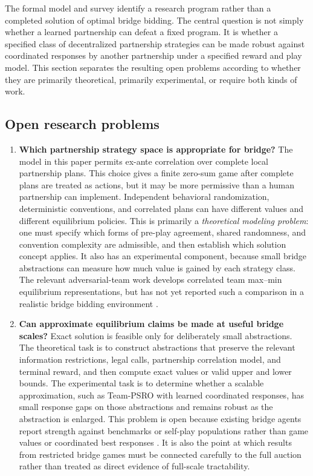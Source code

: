 \documentclass[11pt]{article}
\begin{document}
The formal model and survey identify a research program rather than a completed solution of optimal bridge bidding. The central question is not simply whether a learned partnership can defeat a fixed program. It is whether a specified class of decentralized partnership strategies can be made robust against coordinated responses by another partnership under a specified reward and play model. This section separates the resulting open problems according to whether they are primarily theoretical, primarily experimental, or require both kinds of work.

\subsection{Open research problems}

\begin{enumerate}
    \item \textbf{Which partnership strategy space is appropriate for bridge?} The model in this paper permits ex-ante correlation over complete local partnership plans. This choice gives a finite zero-sum game after complete plans are treated as actions, but it may be more permissive than a human partnership can implement. Independent behavioral randomization, deterministic conventions, and correlated plans can have different values and different equilibrium policies. This is primarily a \emph{theoretical modeling problem}: one must specify which forms of pre-play agreement, shared randomness, and convention complexity are admissible, and then establish which solution concept applies. It also has an experimental component, because small bridge abstractions can measure how much value is gained by each strategy class. The relevant adversarial-team work develops correlated team max--min equilibrium representations, but has not yet reported such a comparison in a realistic bridge bidding environment \cite{farina2018coordination,farina2021collusion,carminati2022marriage,zhang2023teambelief,mcaleer2023teampsro}.

    \item \textbf{Can approximate equilibrium claims be made at useful bridge scales?} Exact solution is feasible only for deliberately small abstractions. The theoretical task is to construct abstractions that preserve the relevant information restrictions, legal calls, partnership correlation model, and terminal reward, and then compute exact values or valid upper and lower bounds. The experimental task is to determine whether a scalable approximation, such as Team-PSRO with learned coordinated responses, has small response gaps on those abstractions and remains robust as the abstraction is enlarged. This problem is open because existing bridge agents report strength against benchmarks or self-play populations rather than game values or coordinated best responses \cite{tian2020joint,qiu2024bridge,kita2024simple}. It is also the point at which results from restricted bridge games \cite{gimbert2020bridge} must be connected carefully to the full auction rather than treated as direct evidence of full-scale tractability.


\end{enumerate}
\end{document}
